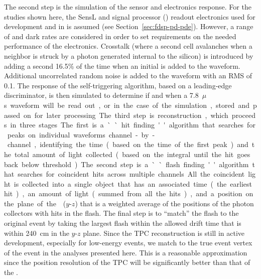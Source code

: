 The second step is the simulation of the sensor and electronics response. For the studies shown here, the SensL  and  signal processor () readout electronics used for  development and in  is assumed (see Section~\ref{sec:fdsp-pd-pde}). However, a range of  and dark rates are considered in order to set requirements on the needed performance of the electronics.
Crosstalk (where a second cell avalanches when a neighbor is struck by a photon generated internal to the silicon) is introduced by adding a second \phel \num{16.5}\% of the time when an initial \phel is added to the waveform. Additional uncorrelated random noise is added to the waveform with an RMS of %
\SI{0.1}{\phel}. The response of the  self-triggering algorithm, based on a leading-edge discriminator, is then simulated to determine if and when a \SI{7.8}{$\mu$s} waveform will be read out, or in the case of the simulation, %
stored and passed on for later processing.

The third step is reconstruction, which proceeds in three stages. The first is a ``hit finding'' algorithm that searches for peaks on individual waveforms channel-by-channel, identifying the time (based on the time of the first peak) and the total amount of light collected (based on the integral until the hit goes back below threshold). The second step is a ``flash finding'' algorithm that searches for coincident hits across multiple channels. All the coincident light is collected into a single object that has an associated time (the earliest hit), an amount of light (summed from all the hits), and a position on the plane of the  ($y$-$z$) that is a weighted average of the positions of the photon collectors with hits in the flash. %
The final step is to ``match'' the flash to the original event by taking the largest flash within the allowed drift time that is within \SI{240}{cm} in the $y$-$z$ plane. Since the TPC reconstruction is still in active development, especially for low-energy events, we match to the true event %
vertex of the event in the analyses presented here. This is a reasonable approximation since the position resolution of the TPC will be significantly better than that of the . 

